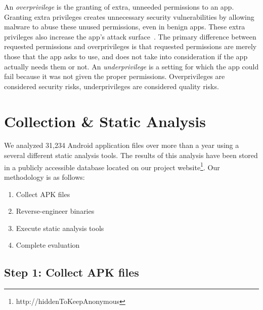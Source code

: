 \documentclass{sig-alternate}
\newif\ifisnopii
\begin{document}
An \emph{overprivilege} is the granting of extra, unneeded permissions to an app. Granting extra privileges creates unnecessary security vulnerabilities by allowing malware to abuse these unused permissions, even in benign apps. These extra privileges also increase the app's attack surface~\cite{Davi:2010:PEA:1949317.1949356}. The primary difference between requested permissions and overprivileges is that requested permissions are merely those that the app asks to use, and does not take into consideration if the app actually needs them or not. An \emph{underprivilege} is a setting for which the app could fail because it was not given the proper permissions. Overprivileges are considered security risks, underprivileges are considered quality risks.





\section{Collection \& Static Analysis}
\label{sec: csa}

We analyzed 31,234 Android application files over more than a year using a several different static analysis tools. The results of this analysis have been stored in a publicly accessible database located on our project website\footnote{\ifisnopii http://darwin.rit.edu/amp/ \else http://hiddenToKeepAnonymous \fi}. Our methodology is as follows:

\begin{enumerate}
    \setlength{\itemsep}{0pt} %
    \setlength{\parskip}{0pt} %
    \setlength{\parsep}{0pt}  %

  \item Collect APK files
  \item Reverse-engineer binaries
  \item Execute static analysis tools
  \item Complete evaluation %
\end{enumerate}

\label{sec: collection}
\subsection{Step 1: Collect APK files}
\end{document}
